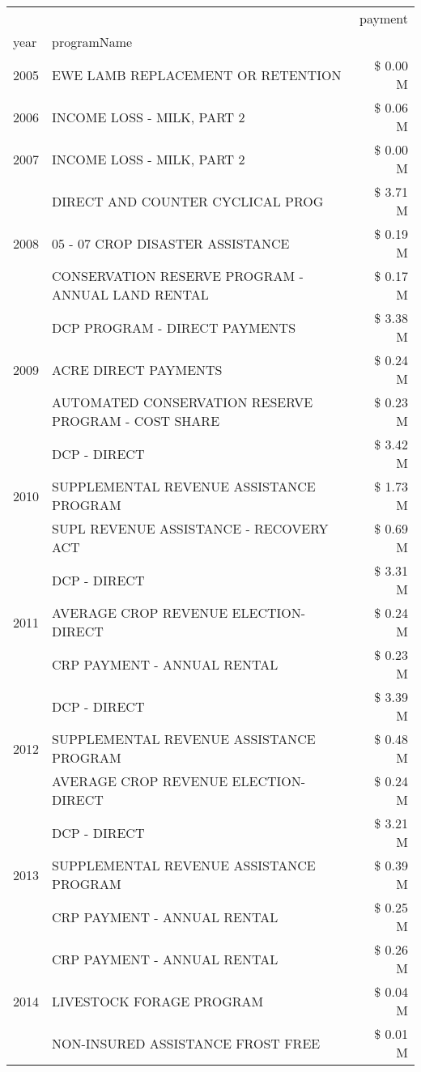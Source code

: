 \begin{tabular}{llr}
\toprule
 &  & payment \\
year & programName &  \\
\midrule
2005 & EWE LAMB REPLACEMENT OR RETENTION & \$ 0.00 M \\
\cline{1-3}
2006 & INCOME LOSS - MILK, PART 2 & \$ 0.06 M \\
\cline{1-3}
2007 & INCOME LOSS - MILK, PART 2 & \$ 0.00 M \\
\cline{1-3}
\multirow[t]{3}{*}{2008} & DIRECT AND COUNTER CYCLICAL PROG & \$ 3.71 M \\
 & 05 - 07 CROP DISASTER ASSISTANCE & \$ 0.19 M \\
 & CONSERVATION RESERVE PROGRAM - ANNUAL LAND RENTAL & \$ 0.17 M \\
\cline{1-3}
\multirow[t]{3}{*}{2009} & DCP PROGRAM - DIRECT PAYMENTS & \$ 3.38 M \\
 & ACRE DIRECT PAYMENTS & \$ 0.24 M \\
 & AUTOMATED CONSERVATION RESERVE PROGRAM - COST SHARE & \$ 0.23 M \\
\cline{1-3}
\multirow[t]{3}{*}{2010} & DCP - DIRECT & \$ 3.42 M \\
 & SUPPLEMENTAL REVENUE ASSISTANCE PROGRAM & \$ 1.73 M \\
 & SUPL REVENUE ASSISTANCE - RECOVERY ACT & \$ 0.69 M \\
\cline{1-3}
\multirow[t]{3}{*}{2011} & DCP - DIRECT & \$ 3.31 M \\
 & AVERAGE CROP REVENUE ELECTION-DIRECT & \$ 0.24 M \\
 & CRP PAYMENT - ANNUAL RENTAL & \$ 0.23 M \\
\cline{1-3}
\multirow[t]{3}{*}{2012} & DCP - DIRECT & \$ 3.39 M \\
 & SUPPLEMENTAL REVENUE ASSISTANCE PROGRAM & \$ 0.48 M \\
 & AVERAGE CROP REVENUE ELECTION-DIRECT & \$ 0.24 M \\
\cline{1-3}
\multirow[t]{3}{*}{2013} & DCP - DIRECT & \$ 3.21 M \\
 & SUPPLEMENTAL REVENUE ASSISTANCE PROGRAM & \$ 0.39 M \\
 & CRP PAYMENT - ANNUAL RENTAL & \$ 0.25 M \\
\cline{1-3}
\multirow[t]{3}{*}{2014} & CRP PAYMENT - ANNUAL RENTAL & \$ 0.26 M \\
 & LIVESTOCK FORAGE PROGRAM & \$ 0.04 M \\
 & NON-INSURED ASSISTANCE FROST FREE & \$ 0.01 M \\

\end{tabular}
